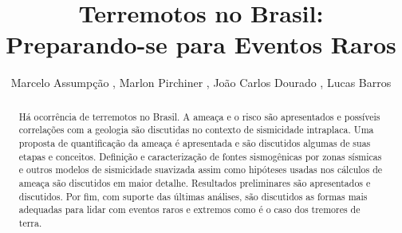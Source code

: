 \documentclass[jgrga]{agutex}
\begin{document}
\title{Terremotos no Brasil:\\
Preparando-se para Eventos Raros
}

\author{Marcelo Assump\c{c}\~ao	, 
		Marlon Pirchiner		, 
		Jo\~ao Carlos Dourado	, 
		Lucas Barros 			 
		}
				
				 



%
%


\begin{abstract}

Há ocorrência de terremotos no Brasil. A ameaça e o risco são apresentados e possíveis correlações com a geologia são discutidas no contexto de sismicidade intraplaca. Uma proposta de quantificação da ameaça é apresentada e são discutidos algumas de suas etapas e conceitos. Definição e caracterização de fontes sismogênicas por zonas sísmicas e outros modelos de sismicidade suavizada assim como hipóteses usadas nos cálculos de ameaça são discutidos em maior detalhe. Resultados preliminares são apresentados e discutidos. Por fim, com suporte das últimas análises, são discutidos as formas mais adequadas para lidar com eventos raros e extremos como é o caso dos tremores de terra.

\end{abstract}
\end{document}
